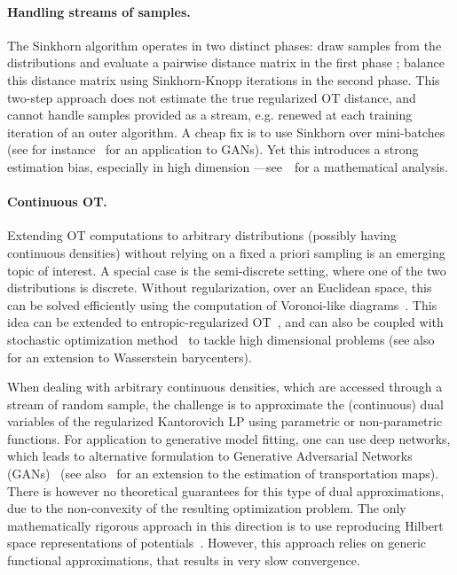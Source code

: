 \paragraph{Handling streams of samples.} The Sinkhorn algorithm operates in two
distinct phases: draw samples from the distributions and evaluate a pairwise distance matrix in the
first phase ; balance this distance matrix using Sinkhorn-Knopp iterations in
the second phase. This two-step approach does not estimate the true regularized OT distance, and cannot handle samples provided as a stream, e.g. renewed
at each training iteration of an outer algorithm. A cheap fix is to use Sinkhorn over mini-batches
(see for instance~\citet{2018-Genevay-aistats} for an application to GANs). Yet
this introduces a strong estimation bias, especially in high dimension
---see~\citet{fatras2019learning} for a mathematical analysis. 

\paragraph{Continuous OT.} Extending OT computations to arbitrary distributions
(possibly having continuous densities) without relying on a fixed a priori
sampling is an emerging topic of interest. A special case is the semi-discrete
setting, where one of the two distributions is discrete. Without regularization,
over an Euclidean space, this can be solved efficiently using the computation of
Voronoi-like diagrams~\cite{merigot2011multiscale}. This idea can be extended to
entropic-regularized OT~\cite{cuturi2018semidual}, and can also be coupled with
stochastic optimization method~\cite{2016-genevay-nips} to tackle high
dimensional problems (see also~\citet{staib2017parallel} for an extension to Wasserstein barycenters). 

When dealing with arbitrary continuous densities, which are accessed through a
stream of random sample, the challenge is to approximate  the (continuous) dual
variables of the regularized Kantorovich LP using parametric or non-parametric functions. For application to
generative model fitting, one can use deep networks, which leads to alternative
formulation to Generative Adversarial Networks (GANs)~\cite{arjovsky2017wgan}
(see also~\citet{seguy2018large} for an extension to the estimation of
transportation maps). There is however no theoretical guarantees for this type
of dual approximations, due to the non-convexity of the resulting optimization
problem. The only mathematically rigorous approach in this direction is to use
reproducing Hilbert space representations of
potentials~\cite{2016-genevay-nips}. However, this approach relies on generic functional
approximations, that results in very slow convergence.


